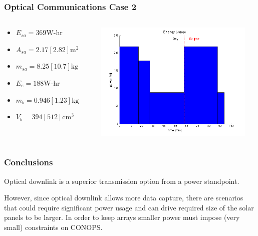 \documentclass{beamer}
\begin{document}
\begin{frame}
  \frametitle{Optical Communications Case 2}
  \begin{center}
    \begin{columns}
      \begin{column}{0.4\textwidth}

        \begin{itemize}
        \item $E_{sa} = 369 \text{W-hr}$
        \item $A_{sa} = 2.17 [2.82] \text{m}^2$
        \item $m_{sa} = 8.25 [10.7] \text{kg}$

        \item $E_e = 188 \text{W-hr}$
        \item $m_b = 0.946 [1.23] \text{kg}$
        \item $V_b = 394 [512] \text{cm}^3$
        \end{itemize}
      \end{column}
      \begin{column}{0.6\textwidth}
        \includegraphics[width=3in]{img/optical-case-2}
      \end{column}
    \end{columns}

  \end{center}
\end{frame}

\begin{frame}
  \frametitle{Conclusions}
  \begin{center}
    Optical downlink is a superior transmission option from a power standpoint.
    \vspace{3em}

    However, since optical downlink allows more data capture, there are scenarios
    that could require significant power usage and can drive required size of the
    solar panels to be larger.  In order to keep arrays smaller power
    must impose (very small) constraints on CONOPS.
  \end{center}
\end{frame}
\end{document}
